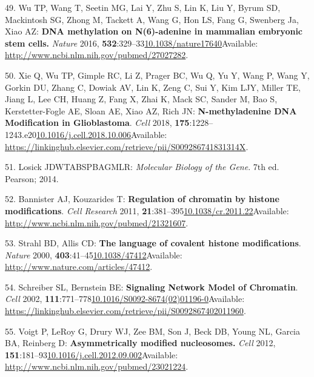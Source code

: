 \documentclass[
]{book}
\begin{document}
\leavevmode\hypertarget{ref-Wu2016}{}%
49. Wu TP, Wang T, Seetin MG, Lai Y, Zhu S, Lin K, Liu Y, Byrum SD, Mackintosh SG, Zhong M, Tackett A, Wang G, Hon LS, Fang G, Swenberg Ja, Xiao AZ: \textbf{DNA methylation on N(6)-adenine in mammalian embryonic stem cells.} \emph{Nature} 2016, \textbf{532}:329--33\href{https://doi.org/10.1038/nature17640}{10.1038/nature17640}Available: \url{http://www.ncbi.nlm.nih.gov/pubmed/27027282}.

\leavevmode\hypertarget{ref-Xie2018}{}%
50. Xie Q, Wu TP, Gimple RC, Li Z, Prager BC, Wu Q, Yu Y, Wang P, Wang Y, Gorkin DU, Zhang C, Dowiak AV, Lin K, Zeng C, Sui Y, Kim LJY, Miller TE, Jiang L, Lee CH, Huang Z, Fang X, Zhai K, Mack SC, Sander M, Bao S, Kerstetter-Fogle AE, Sloan AE, Xiao AZ, Rich JN: \textbf{N-methyladenine DNA Modification in Glioblastoma}. \emph{Cell} 2018, \textbf{175}:1228--1243.e20\href{https://doi.org/10.1016/j.cell.2018.10.006}{10.1016/j.cell.2018.10.006}Available: \url{https://linkinghub.elsevier.com/retrieve/pii/S009286741831314X}.

\leavevmode\hypertarget{ref-Losick2014}{}%
51. Losick JDWTABSPBAGMLR: \emph{Molecular Biology of the Gene}. 7th ed. Pearson; 2014.

\leavevmode\hypertarget{ref-Bannister2011}{}%
52. Bannister AJ, Kouzarides T: \textbf{Regulation of chromatin by histone modifications}. \emph{Cell Research} 2011, \textbf{21}:381--395\href{https://doi.org/10.1038/cr.2011.22}{10.1038/cr.2011.22}Available: \url{http://www.ncbi.nlm.nih.gov/pubmed/21321607}.

\leavevmode\hypertarget{ref-Strahl2000}{}%
53. Strahl BD, Allis CD: \textbf{The language of covalent histone modifications}. \emph{Nature} 2000, \textbf{403}:41--45\href{https://doi.org/10.1038/47412}{10.1038/47412}Available: \url{http://www.nature.com/articles/47412}.

\leavevmode\hypertarget{ref-Schreiber2002}{}%
54. Schreiber SL, Bernstein BE: \textbf{Signaling Network Model of Chromatin}. \emph{Cell} 2002, \textbf{111}:771--778\href{https://doi.org/10.1016/S0092-8674(02)01196-0}{10.1016/S0092-8674(02)01196-0}Available: \url{https://linkinghub.elsevier.com/retrieve/pii/S0092867402011960}.

\leavevmode\hypertarget{ref-Voigt2012}{}%
55. Voigt P, LeRoy G, Drury WJ, Zee BM, Son J, Beck DB, Young NL, Garcia BA, Reinberg D: \textbf{Asymmetrically modified nucleosomes.} \emph{Cell} 2012, \textbf{151}:181--93\href{https://doi.org/10.1016/j.cell.2012.09.002}{10.1016/j.cell.2012.09.002}Available: \url{http://www.ncbi.nlm.nih.gov/pubmed/23021224}.
\end{document}
